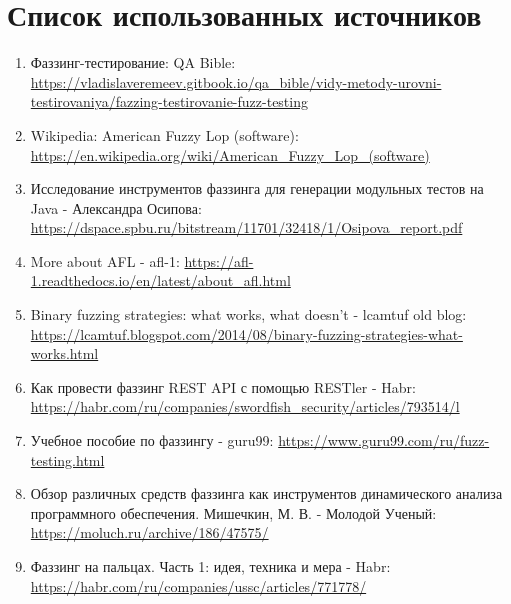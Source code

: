 \clearpage                                  %
\chapter*{Список использованных источников}	
\label{references}
\printbibliography[env=SSTfirst]                         %
\begin{enumerate}[label=\arabic*.]
	\item Фаззинг-тестирование: QA Bible: \url{https://vladislaveremeev.gitbook.io/qa_bible/vidy-metody-urovni-testirovaniya/fazzing-testirovanie-fuzz-testing}
	
	\item Wikipedia: American Fuzzy Lop (software): \url{https://en.wikipedia.org/wiki/American_Fuzzy_Lop_(software)}
	
	\item Исследование инструментов фаззинга для
	генерации модульных тестов на Java - Александра Осипова:
	\url{https://dspace.spbu.ru/bitstream/11701/32418/1/Osipova_report.pdf}
	
	\item More about AFL - afl-1: \url{https://afl-1.readthedocs.io/en/latest/about_afl.html}
	
	\item Binary fuzzing strategies: what works, what doesn't - lcamtuf old blog: \url{https://lcamtuf.blogspot.com/2014/08/binary-fuzzing-strategies-what-works.html}
	\item Как провести фаззинг REST API с помощью RESTler - Habr: \url{https://habr.com/ru/companies/swordfish_security/articles/793514/l}
	
	\item Учебное пособие по фаззингу  - guru99: \url{https://www.guru99.com/ru/fuzz-testing.html}
	
	\item Обзор различных средств фаззинга как инструментов динамического анализа программного обеспечения. Мишечкин, М. В. - Молодой Ученый: \url{https://moluch.ru/archive/186/47575/}
	
	 	\item Фаззинг на пальцах. Часть 1: идея, техника и мера - Habr:
	 	 \url{https://habr.com/ru/companies/ussc/articles/771778/}
\end{enumerate}
